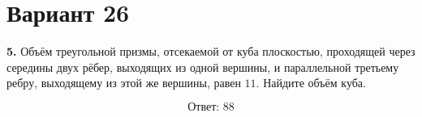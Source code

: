 \documentclass[12pt,a4paper]{article}
\begin{document}
\section*{Вариант 26}

\textbf{5.} Объём треугольной призмы, отсекаемой от куба плоскостью,
проходящей через середины двух рёбер, выходящих из одной вершины,
и параллельной третьему ребру, выходящему из этой же вершины,
равен \(11\). Найдите объём куба.

\begin{center}
\end{center}

\[
\boxed{\text{Ответ: }88}
\]
\end{document}
